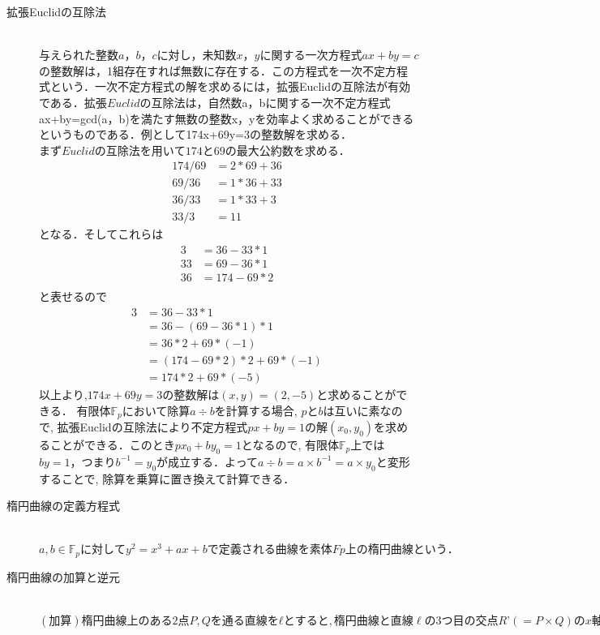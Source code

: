 \documentclass[openany,11pt,papersize]{jsbook}
\begin{document}
\begin{description}
 \item[拡張Euclidの互除法]\mbox{}\\
$与えられた整数a，b，cに対し，未知数x，yに関する一次方程式ax+by=c$の整数解は，1組存在すれば無数に存在する．この方程式を一次不定方程式という．一次不定方程式の解を求めるには，拡張Euclidの互除法が有効である．拡張$Euclidの互除法は，$自然数a，bに関する一次不定方程式ax+by=gcd(a，b)を満たす無数の整数x，yを効率よく求めることができるというものである．例として174x+69y=3の整数解を求める．$
まずEuclidの互除法を用いて174と69の最大公約数を求める．$
	\begin{align*} 
		174/69&=2*69+36 \\
		69/36&=1*36+33　\\
		36/33&=1*33+3 \\
		33/3&=11 	
 	\end{align*}
	となる．そしてこれらは
	\begin{align*} 
	3&=36-33*1 \\
	33&=69-36*1 \\
	36&=174-69*2 \\
 	\end{align*}
	と表せるので
	\begin{align*} 
	3&=36-33*1 \\
	&=36-(69-36*1)*1 \\
	&=36*2+69*(-1) \\
	&=(174-69*2)*2+69*(-1) \\
	&=174*2+69*(-5)
 	\end{align*}
以上より,$174x+69y=3の整数解は(x,y)=(2,-5)$と求めることができる．
有限体$\mathbb{F}_p$において除算$a÷b$を計算する場合, $pとb$は互いに素なので, 拡張Euclidの互除法により不定方程式$px + by = 1 の解(x_0, y_0)$を求めることができる．このとき$px_0+ by_0= 1$となるので, 有限体$\mathbb{F}_p$上では$by = 1，つまりb^{−1} = y_0$が成立する．よって$a÷b=a×b^{-1}=a×y_0$と変形することで, 除算を乗算に置き換えて計算できる．


	
\item[楕円曲線の定義方程式]\mbox{}\\
$a,b \in \mathbb{F}_pに対してy^2 = x^3 + ax + bで定義される曲線を素体Fp上の楕円曲線という．$

\item[楕円曲線の加算と逆元]\mbox{}\\
$(加算) 楕円曲線上のある2点P,Qを通る直線をℓとすると,楕円曲線と直線 \ell の3つ目の交点R’(=P×Q)のx軸に関する対称点をRとする．これで得られた点RをR'の逆元と呼び，R=-R'が成り立つ．また，RをPとQを加算した点と定義し，R=P+Qが成り立つ．$


\end{description}
\end{document}
